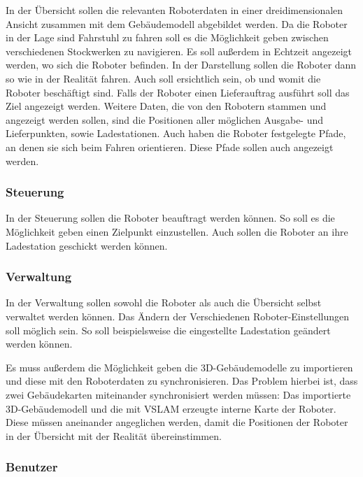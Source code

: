 In der Übersicht sollen die relevanten Roboterdaten in einer dreidimensionalen Ansicht zusammen mit dem Gebäudemodell abgebildet werden. Da die Roboter in der Lage sind Fahrstuhl zu fahren soll es die Möglichkeit geben zwischen verschiedenen Stockwerken zu navigieren. Es soll außerdem in Echtzeit angezeigt werden, wo sich die Roboter befinden. In der Darstellung sollen die Roboter dann so wie in der Realität fahren. Auch soll ersichtlich sein, ob und womit die Roboter beschäftigt sind. Falls der Roboter einen Lieferauftrag ausführt soll das Ziel angezeigt werden. Weitere Daten, die von den Robotern stammen und angezeigt werden sollen, sind die Positionen aller möglichen Ausgabe- und Lieferpunkten, sowie Ladestationen. Auch haben die Roboter festgelegte Pfade, an denen sie sich beim Fahren orientieren. Diese Pfade sollen auch angezeigt werden.

\subsubsection{Steuerung}

In der Steuerung sollen die Roboter beauftragt werden können. So soll es die Möglichkeit geben einen Zielpunkt einzustellen. Auch sollen die Roboter an ihre Ladestation geschickt werden können.

\subsubsection{Verwaltung}

In der Verwaltung sollen sowohl die Roboter als auch die Übersicht selbst verwaltet werden können. Das Ändern der Verschiedenen Roboter-Einstellungen soll möglich sein. So soll beispielsweise die eingestellte Ladestation geändert werden können.

Es muss außerdem die Möglichkeit geben die 3D-Gebäudemodelle zu importieren und diese mit den Roboterdaten zu synchronisieren. Das Problem hierbei ist, dass zwei Gebäudekarten miteinander synchronisiert werden müssen: Das importierte 3D-Gebäudemodell und die mit \ac{VSLAM} erzeugte interne Karte der Roboter. Diese müssen aneinander angeglichen werden, damit die Positionen der Roboter in der Übersicht mit der Realität übereinstimmen.

\subsubsection{Benutzer}

